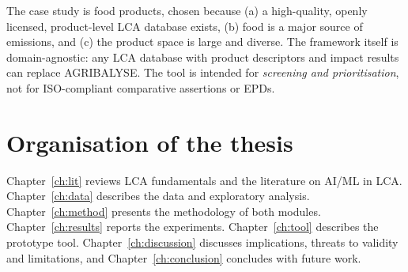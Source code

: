The case study is food products, chosen because (a) a high-quality, openly licensed, product-level
LCA database exists, (b) food is a major source of emissions, and (c) the product space is large
and diverse. The framework itself is domain-agnostic: any LCA database with product descriptors
and impact results can replace AGRIBALYSE. The tool is intended for \emph{screening and
prioritisation}, not for ISO-compliant comparative assertions or EPDs.

\section{Organisation of the thesis}

Chapter~\ref{ch:lit} reviews LCA fundamentals and the literature on AI/ML in LCA.
Chapter~\ref{ch:data} describes the data and exploratory analysis. Chapter~\ref{ch:method}
presents the methodology of both modules. Chapter~\ref{ch:results} reports the experiments.
Chapter~\ref{ch:tool} describes the prototype tool. Chapter~\ref{ch:discussion} discusses
implications, threats to validity and limitations, and Chapter~\ref{ch:conclusion} concludes with
future work.
